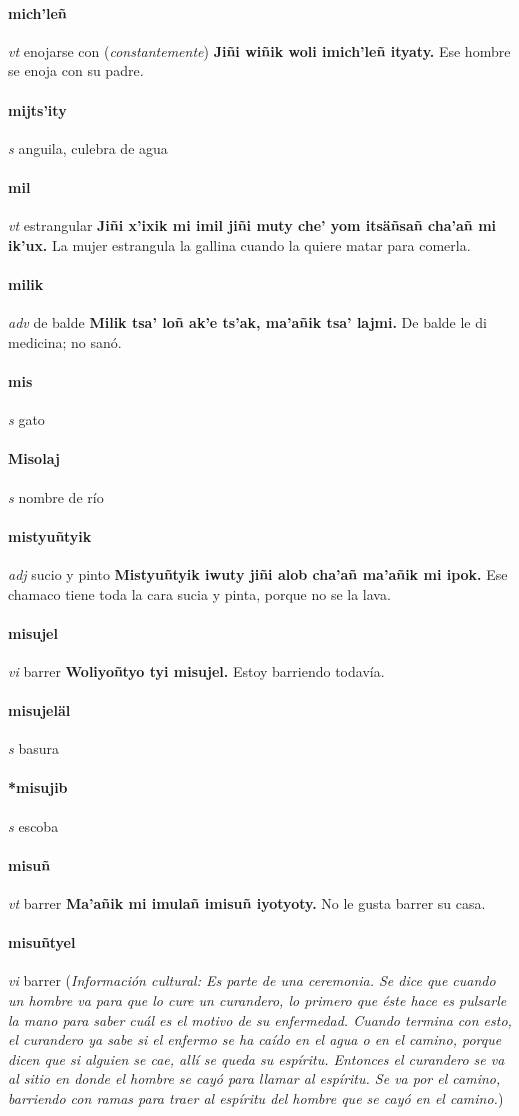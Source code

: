\documentclass{scrbook}
\newcommand{\entry}[1]{\paragraph{#1}}
\newcommand{\partofspeech}[1]{\textit{#1}}
\newcommand{\spanishtranslation}[1]{#1}
\newcommand{\clarification}[1]{(\textit{#1})}
\newcommand{\cholexample}[1]{\textbf{#1}}
\newcommand{\exampletranslation}[1]{#1}
\newcommand{\culturalinformation}[1]{(\textit{#1})}
\begin{document}
\begin{multicols}{2}
\entry{mich'leñ}
\partofspeech{vt}
\spanishtranslation{enojarse con}
\clarification{constantemente}
\cholexample{Jiñi wiñik woli imich'leñ ityaty.}
\exampletranslation{Ese hombre se enoja con su padre.}

\entry{mijts'ity}
\partofspeech{s}
\spanishtranslation{anguila, culebra de agua}

\entry{mil}
\partofspeech{vt}
\spanishtranslation{estrangular}
\cholexample{Jiñi x'ixik mi imil jiñi muty che' yom itsäñsañ cha'añ mi ik'ux.}
\exampletranslation{La mujer estrangula la gallina cuando la quiere matar para comerla.}

\entry{milik}
\partofspeech{adv}
\spanishtranslation{de balde}
\cholexample{Milik tsa' loñ ak'e ts'ak, ma'añik tsa' lajmi.}
\exampletranslation{De balde le di medicina; no sanó.}

\entry{mis}
\partofspeech{s}
\spanishtranslation{gato}

\entry{Misolaj}
\partofspeech{s}
\spanishtranslation{nombre de río}

\entry{mistyuñtyik}
\partofspeech{adj}
\spanishtranslation{sucio y pinto}
\cholexample{Mistyuñtyik iwuty jiñi alob cha'añ ma'añik mi ipok.}
\exampletranslation{Ese chamaco tiene toda la cara sucia y pinta, porque no se la lava.}

\entry{misujel}
\partofspeech{vi}
\spanishtranslation{barrer}
\cholexample{Woliyoñtyo tyi misujel.}
\exampletranslation{Estoy barriendo todavía.}

\entry{misujeläl}
\partofspeech{s}
\spanishtranslation{basura}

\entry{*misujib}
\partofspeech{s}
\spanishtranslation{escoba}

\entry{misuñ}
\partofspeech{vt}
\spanishtranslation{barrer}
\cholexample{Ma'añik mi imulañ imisuñ iyotyoty.}
\exampletranslation{No le gusta barrer su casa.}

\entry{misuñtyel}
\partofspeech{vi}
\spanishtranslation{barrer}
\culturalinformation{Información cultural: Es parte de una ceremonia. Se dice que cuando un hombre va para que lo cure un curandero, lo primero que éste hace es pulsarle la mano para saber cuál es el motivo de su enfermedad. Cuando termina con esto, el curandero ya sabe si el enfermo se ha caído en el agua o en el camino, porque dicen que si alguien se cae, allí se queda su espíritu. Entonces el curandero se va al sitio en donde el hombre se cayó para llamar al espíritu. Se va por el camino, barriendo con ramas para traer al espíritu del hombre que se cayó en el camino.}


\end{multicols}
\end{document}
